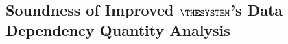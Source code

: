 \subsection{Soundness of Improved $\THESYSTEM$'s Data Dependency Quantity Analysis}
\label{apdx:edgeweight_soundness}

\clearpage

% 
\clearpage